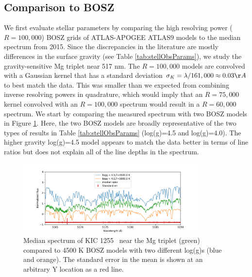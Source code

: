 \documentclass[preprint]{aastex61}
\newcommand{\shStar}{KIC 1255}
\begin{document}
\subsection{Comparison to BOSZ}
We first evaluate stellar parameters by comparing the high resolving power ($R=100,000$) BOSZ grids of ATLAS-APOGEE ATLAS9 models \citep{bohlin2017bosz} to the median spectrum from 2015.
Since the discrepancies in the literature are mostly differences in the surface gravity (see Table \ref{tab:stellObsParams}), we study the gravity-sensitive Mg triplet near 517 nm.
The $R=100,000$ models are convolved with a Gaussian kernel that has a standard deviation $\sigma_K = \lambda/161,000 \approx 0.03 \AA$ to best match the data.
This was smaller than we expected from combining inverse resolving powers in quadrature, which would imply that an $R=75,000 $ kernel convolved with an $R=100,000$ spectrum would result in a $R=60,000$ spectrum.
We start by comparing the measured spectrum with two BOSZ models in Figure \ref{fig:mgTripletBOSZ}.
Here, the two BOSZ models are broadly representative of the two types of results in Table \ref{tab:stellObsParams} (log(g)=4.5 and log(g)=4.0).
The higher gravity log(g)=4.5 model appears to match the data better in terms of line ratios but does not explain all of the line depths in the spectrum.

\begin{figure}[!hbtp]
\begin{centering}
\includegraphics[width=0.85\textwidth]{images/subaru/bosz_mg_triplet_median_spec_w_5000.pdf}
\caption{Median spectrum of \shStar\ \citep{masuda2018rvKIC1255} near the Mg triplet (green) compared to 4500 K BOSZ models with two different log(g)s (blue and orange). The standard error in the mean is shown at an arbitrary Y location as a red line.}\label{fig:mgTripletBOSZ}
\end{centering}
\end{figure}
\end{document}
